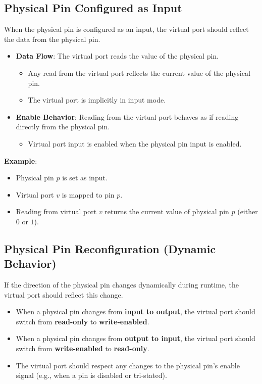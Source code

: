 \subsection{Physical Pin Configured as Input}
When the physical pin is configured as an input, the virtual port should reflect the data from the physical pin.

\begin{itemize}[noitemsep]
    \item \textbf{Data Flow}: The virtual port reads the value of the physical pin.
    \begin{itemize}[noitemsep]
        \item Any read from the virtual port reflects the current value of the physical pin.
        \item The virtual port is implicitly in input mode.
    \end{itemize}
    \item \textbf{Enable Behavior}: Reading from the virtual port behaves as if reading directly from the physical pin.
    \begin{itemize}[noitemsep]
        \item Virtual port input is enabled when the physical pin input is enabled.
    \end{itemize}
\end{itemize}

\textbf{Example}:
\begin{itemize}[noitemsep]
    \item Physical pin $p$ is set as input.
    \item Virtual port $v$ is mapped to pin $p$.
    \item Reading from virtual port $v$ returns the current value of physical pin $p$ (either $0$ or $1$).
\end{itemize}

\subsection{Physical Pin Reconfiguration (Dynamic Behavior)}
If the direction of the physical pin changes dynamically during runtime, the virtual port should reflect this change.

\begin{itemize}[noitemsep]
    \item When a physical pin changes from \textbf{input to output}, the virtual port should switch from \textbf{read-only} to \textbf{write-enabled}.
    \item When a physical pin changes from \textbf{output to input}, the virtual port should switch from \textbf{write-enabled} to \textbf{read-only}.
    \item The virtual port should respect any changes to the physical pin's enable signal (e.g., when a pin is disabled or tri-stated).
\end{itemize}

